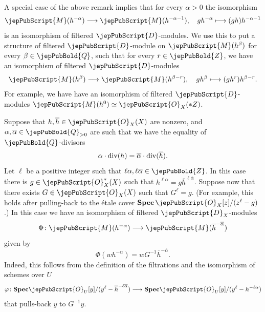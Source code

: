 A special case of the above remark implies that for every $\alpha>0$ the isomorphism
$$\jepPubScript{M}(h^{-\alpha})\longrightarrow\jepPubScript{M}(h^{-\alpha-1}),\quad gh^{-\alpha}\longmapsto (gh)h^{-\alpha-1}$$
is an isomorphism of filtered $\jepPubScript{D}$-modules. We use this to put a structure of filtered
$\jepPubScript{D}$-module on $\jepPubScript{M}(h^{\beta})$ for every $\beta\in\jepPubBold{Q}$, such that for every $r\in\jepPubBold{Z}$,
we have an isomorphism of filtered $\jepPubScript{D}$-modules
$$\jepPubScript{M}(h^{\beta})\longrightarrow\jepPubScript{M}(h^{\beta-r}),\quad gh^{\beta}\longmapsto (gh^r)h^{\beta-r}.$$
For example, we have have an isomorphism of filtered $\jepPubScript{D}$-modules $\jepPubScript{M}(h^0)\simeq \jepPubScript{O}_X(*Z)$.


\begin{remark}\label{rem_indep_equations1}
Suppose that $h, \overline{h} \in\jepPubScript{O}_X(X)$ are nonzero, and $\alpha,\overline{\alpha}\in\jepPubBold{Q}_{>0}$ are 
such that we have the equality of $\jepPubBold{Q}$-divisors
$$\alpha \cdot {\rm div}(h)=\overline{\alpha}\cdot {\rm div}(\overline{h}).$$
Let $\ell$ be  a positive integer such that $\ell\alpha,\ell\overline{\alpha}\in\jepPubBold{Z}$.
In this case there is $g\in\jepPubScript{O}_X^*(X)$ such that $h^{\ell\alpha}=g{\overline{h}}^{\ell\overline{\alpha}}$.
 Suppose now that there exists $G\in\jepPubScript{O}_X(X)$ such that $G^{\ell}=g$. (For example, this holds after pulling-back to the
\'{e}tale cover $\mathbf{Spec}\,\jepPubScript{O}_X[z]/(z^{\ell}-g)$.)
In this case we have an isomorphism of filtered $\jepPubScript{D}_X$-modules
$$\Phi\colon \jepPubScript{M}(h^{-\alpha})\longrightarrow \jepPubScript{M}(\overline{h}^{-\overline{\alpha}})$$
given by
$$\Phi(wh^{-\alpha})=wG^{-1}\overline{h}^{-\overline{\alpha}}.$$
Indeed, this follows from the definition of the filtrations and the isomorphism of schemes over $U$
$$\varphi\colon {\bf Spec} \jepPubScript{O}_U[y]/(y^{\ell}-\overline{h}^{-\ell\overline{\alpha}})\longrightarrow {\bf Spec} \jepPubScript{O}_U[y]/(y^{\ell}-h^{-\ell\alpha})$$
that pulls-back $y$ to $G^{-1}y$. 
\end{remark}

